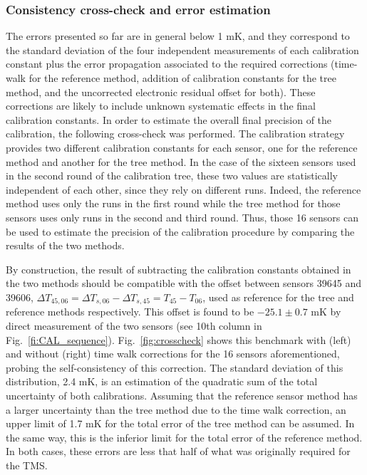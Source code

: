\subsubsection{Consistency cross-check and error estimation} 
\label{sec:crossCheck}
\noindent The errors presented so far are in general below 1 mK, and they correspond to the standard deviation of the four independent measurements of each calibration constant plus the error propagation associated to the required corrections (time-walk for the reference method, addition of calibration constants for the tree method, and the uncorrected electronic residual offset for both). These corrections are likely to include unknown systematic effects in the final calibration constants. In order to estimate the overall final precision of the calibration, the following cross-check was performed. The calibration strategy provides two different calibration constants for each sensor, one for the reference method and another for the tree method. In the case of the sixteen sensors used in the second round of the calibration tree, these two values are statistically independent of each other, since they rely on  different runs. Indeed, the reference method uses only the runs in the first round while the tree method for those sensors uses only runs in the second and third round. Thus, those 16 sensors can be used to estimate the precision of the calibration procedure by comparing the results of the two methods.

By construction, the result of subtracting the calibration constants obtained in the two methods should be compatible with the offset between sensors 39645 and 39606, $\Delta T_{45,06} = \Delta T_{s,06}-\Delta T_{s,45} = T_{45}-T_{06}$, used as reference for the tree and reference methods respectively. This offset is found to be $-25.1 \pm 0.7$ mK by direct measurement of the two sensors (see 10th column in Fig.~\ref{fi:CAL_sequence}).  Fig.~\ref{fig:crosscheck} shows this benchmark with (left) and without (right) time walk corrections for the 16 sensors aforementioned, probing the self-consistency of this correction. The standard deviation of this distribution, 2.4 mK, is an estimation of the quadratic sum of the total uncertainty of both calibrations. Assuming that the reference sensor method has a larger uncertainty than the tree method due to the time walk correction, an upper limit of 1.7 mK for the total error of the tree method can be assumed. In the same way, this is the inferior limit for the total error of the reference method. In both cases, these errors are less that half of what was originally required for the TMS.

